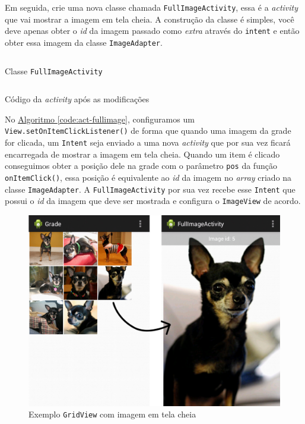 \documentclass[a4paper,12pt,brazil,oneside]{book}
\begin{document}
Em seguida, crie uma nova classe chamada \texttt{FullImageActivity}, essa é a \emph{activity} que vai mostrar a imagem em tela cheia. A construção da classe é simples, você deve apenas obter o \emph{id} da imagem passado como \emph{extra} através do \texttt{intent} e então obter essa imagem da classe \texttt{ImageAdapter}.

\begin{listing}[H]
\inputminted[linenos=true,fontsize=\small,frame=lines, framesep=2mm, tabsize=2,numbersep=5pt]{java}{src/design/FullImageActivity.java}
\caption{Classe \texttt{FullImageActivity}}
\end{listing}	 	 	

\begin{listing}[H]
\inputminted[linenos=true,fontsize=\small,frame=lines, framesep=2mm, tabsize=2,numbersep=5pt]{java}{src/design/grid-activity-p2.java}
\caption{Código da \emph{activity} após as modificações}
\label{code:act-fullimage}
\end{listing}	 

No \hyperref[code:act-fullimage]{Algoritmo \ref*{code:act-fullimage}}, configuramos um \texttt{View.setOnItemClickListener()} de forma que quando uma imagem da grade for clicada, um \texttt{Intent} seja enviado a uma nova \emph{activity} que por sua vez ficará encarregada de mostrar a imagem em tela cheia.  Quando um item é clicado conseguimos obter a posição dele na grade com o parâmetro \texttt{pos} da função \texttt{onItemClick()}, essa posição é equivalente ao \emph{id} da imagem no \emph{array} criado na classe \texttt{ImageAdapter}.  A \texttt{FullImageActivity} por sua vez recebe esse \texttt{Intent} que possui o \emph{id} da imagem que deve ser mostrada e configura o \texttt{ImageView} de acordo. 

\begin{figure}[H]
  \centering
  \includegraphics[width=.80\textwidth]{figuras/design/grid-fullimage.jpg}
  \caption{Exemplo \texttt{GridView} com imagem em tela cheia}
  \label{fig:e16}
\end{figure}
\end{document}
